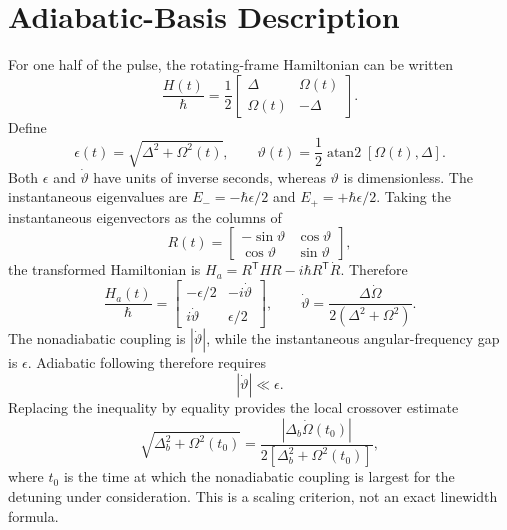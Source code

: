 \section{Adiabatic-Basis Description}
\label{sec:adiabatic-basis}

For one half of the pulse, the rotating-frame Hamiltonian can be written
\begin{equation}
    \frac{H(t)}{\hbar}
    =\frac{1}{2}
    \begin{bmatrix}
        \Delta & \Omega(t)\\
        \Omega(t) & -\Delta
    \end{bmatrix}.
    \label{eq:rotated-hamiltonian-matrix}
\end{equation}
Define
\begin{equation}
    \epsilon(t)=\sqrt{\Delta^2+\Omega^2(t)},
    \qquad
    \vartheta(t)=\frac{1}{2}\operatorname{atan2}[\Omega(t),\Delta].
\end{equation}
Both $\epsilon$ and $\dot{\vartheta}$ have units of inverse seconds, whereas
$\vartheta$ is dimensionless.  The instantaneous eigenvalues are
$E_-=-\hbar\epsilon/2$ and $E_+=+\hbar\epsilon/2$.  Taking the instantaneous eigenvectors as the
columns of
\begin{equation}
    R(t)=
    \begin{bmatrix}
        -\sin\vartheta & \cos\vartheta\\
        \cos\vartheta & \sin\vartheta
    \end{bmatrix},
\end{equation}
the transformed Hamiltonian is
$H_a=R^{\mathsf T}HR-i\hbar R^{\mathsf T}\dot R$.  Therefore
\begin{equation}
    \frac{H_a(t)}{\hbar}
    =
    \begin{bmatrix}
        -\epsilon/2 & -i\dot{\vartheta}\\
        i\dot{\vartheta} & \epsilon/2
    \end{bmatrix},
    \qquad
    \dot{\vartheta}
    =\frac{\Delta\dot{\Omega}}
    {2(\Delta^2+\Omega^2)}.
    \label{eq:adiabatic-hamiltonian}
\end{equation}
The nonadiabatic coupling is $|\dot{\vartheta}|$, while the instantaneous
angular-frequency gap is $\epsilon$.  Adiabatic following therefore
requires~\cite{boradjiev_power_2013}
\begin{equation}
    |\dot{\vartheta}|\ll\epsilon.
    \label{eq:adiabatic-condition}
\end{equation}
Replacing the inequality by equality provides the local crossover estimate
\begin{equation}
    \sqrt{\Delta_b^2+\Omega^2(t_0)}
    =
    \frac{|\Delta_b\dot{\Omega}(t_0)|}
    {2[\Delta_b^2+\Omega^2(t_0)]},
    \label{eq:adiabatic-boundary}
\end{equation}
where $t_0$ is the time at which the nonadiabatic coupling is largest for the
detuning under consideration.  This is a scaling criterion, not an exact
linewidth formula.

